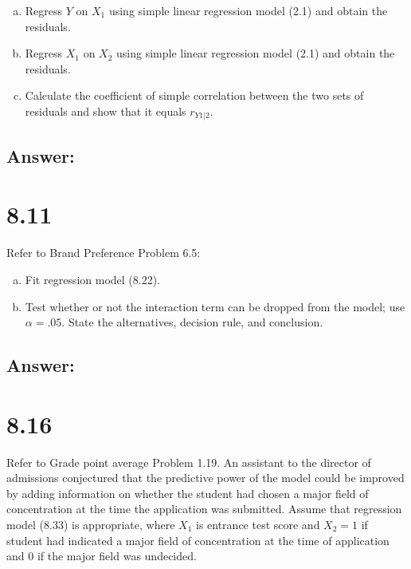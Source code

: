 \documentclass{article}
\begin{document}
\begin{enumerate}[a)]
\item{} Regress $Y$ on $X_1$ using simple linear regression model (2.1) and obtain the residuals.
\item{} Regress $X_1$ on $X_2$ using simple linear regression model (2.1) and obtain the residuals.
\item{} Calculate the coefficient of simple correlation between the two sets of residuals and show that it equals $r_{Y1|2}$.
\end{enumerate}

\subsection{Answer:}

\section{8.11}

Refer to Brand Preference Problem 6.5:

\begin{enumerate}[a)]
\item{} Fit regression model (8.22).
\item{} Test whether or not the interaction term can be dropped from the model; use $\alpha{} = .05$. State the alternatives, decision rule, and conclusion.
\end{enumerate}

\subsection{Answer:}

\section{8.16}

Refer to Grade point average Problem 1.19. An assistant to the director of admissions conjectured that the predictive power of the model could be improved by adding information on whether the student had chosen a major field of concentration at the time the application was submitted. Assume that regression model (8.33) is appropriate, where $X_1$ is entrance test score and $X_2 = 1$ if student had indicated a major field of concentration at the time of application and 0 if the major field was undecided. 
\end{document}
